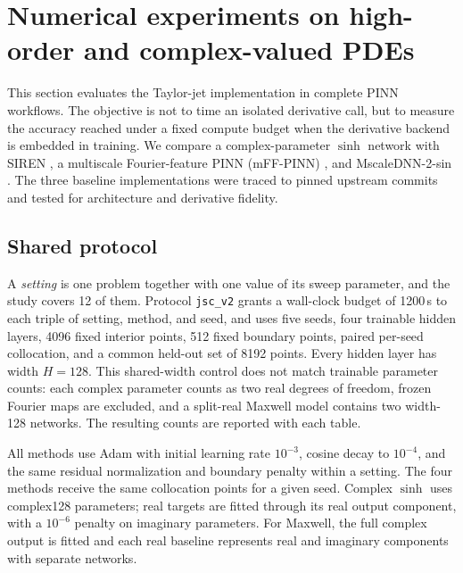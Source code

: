 
\section{Numerical experiments on high-order and complex-valued PDEs}
\label{sec:osc}

This section evaluates the Taylor-jet implementation in complete PINN
workflows. The objective is not to time an isolated derivative call, but to
measure the accuracy reached under a fixed compute budget when the derivative
backend is embedded in training. We compare a complex-parameter \(\sinh\)
network with SIREN \cite{Sitzmann2020SIREN}, a multiscale Fourier-feature PINN
(mFF-PINN) \cite{Tancik2020Fourier,Wang2021Pathologies}, and MscaleDNN-2-sin
\cite{Liu2020MscaleDNN}. The three baseline implementations were traced to
pinned upstream commits and tested for architecture and derivative fidelity.

\subsection{Shared protocol}
\label{sec:bm:protocol}

A \emph{setting} is one problem together with one value of its sweep parameter,
and the study covers 12 of them. Protocol
\texttt{jsc\_v2} grants a wall-clock budget of 1200\,s to each triple of
setting, method, and seed, and uses five seeds, four trainable
hidden layers, 4096 fixed interior points, 512 fixed boundary points, paired
per-seed collocation, and a common held-out set of 8192 points. Every hidden
layer has width \(H=128\). This shared-width control does not match trainable
parameter counts:
each complex parameter counts as two real degrees of freedom, frozen Fourier
maps are excluded, and a split-real Maxwell model contains two width-128
networks. The resulting counts are reported with each table.

All methods use Adam with initial learning rate \(10^{-3}\), cosine decay to
\(10^{-4}\), and the same residual normalization and boundary penalty within
a setting. The four methods receive the same collocation points
for a given seed. Complex \(\sinh\) uses complex128 parameters; real targets are
fitted through its real output component, with a \(10^{-6}\) penalty on
imaginary parameters. For Maxwell, the full complex output is fitted and each
real baseline represents real and imaginary components with separate
networks.


